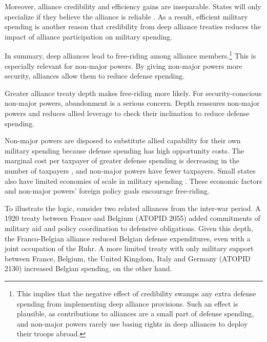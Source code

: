 \documentclass[12pt]{article}
\begin{document}
Moreover, alliance credibility and efficiency gains are inseparable. 
States will only specialize if they believe the alliance is reliable \citep{Leeds2003a}. 
As a result, efficient military spending is another reason that credibility from deep alliance treaties reduces the impact of alliance participation on military spending. 


In summary, deep alliances lead to free-riding among alliance members.\footnote{This implies that the negative effect of credibility swamps any extra defense spending from implementing deep alliance provisions. Such an effect is plausible, as contributions to alliances are a small part of defense spending, and non-major powers rarely use basing rights in deep alliances to deploy their troops abroad.} 
This is especially relevant for non-major powers.
By giving non-major powers more security, alliances allow them to reduce defense spending.


Greater alliance treaty depth makes free-riding more likely. 
For security-conscious non-major powers, abandonment is a serious concern. 
Depth reassures non-major powers and reduces allied leverage to check their inclination to reduce defense spending. 


Non-major powers are disposed to substitute allied capability for their own military spending because defense spending has high opportunity costs. 
The marginal cost per taxpayer of greater defense spending is decreasing in the number of taxpayers \citep{DudleyMontmarquette1981}, and non-major powers have fewer taxpayers. 
Small states also have limited economies of scale in military spending \citep{Moravcsik1991, Kapstein1991, Anderton1995, Devore2013}.
These economic factors and non-major powers' foreign policy goals encourage free-riding.  


To illustrate the logic, consider two related alliances from the inter-war period. 
A 1920 treaty between France and Belgium (ATOPID 2055) added commitments of military aid and policy coordination to defensive obligations. 
Given this depth, the Franco-Belgian alliance reduced Belgian defense expenditures, even with a joint occupation of the Ruhr. 
A more limited treaty with only military support between France, Belgium, the United Kingdom, Italy and Germany (ATOPID 2130) increased Belgian spending, on the other hand.   
 
\end{document}
